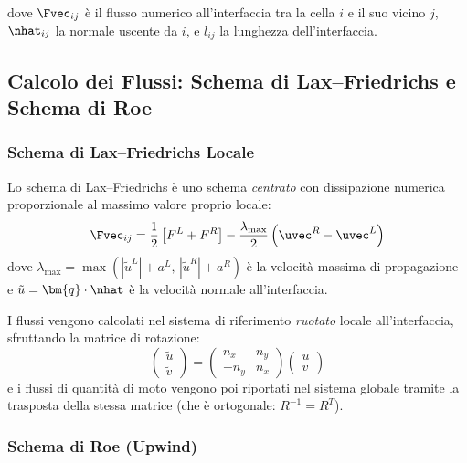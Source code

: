 dove $\Fvec_{ij}$ è il flusso numerico all'interfaccia tra la cella $i$ e il suo vicino $j$,
$\nhat_{ij}$ la normale uscente da $i$, e $l_{ij}$ la lunghezza dell'interfaccia.

\subsection{Calcolo dei Flussi: Schema di Lax--Friedrichs e Schema di Roe}

\subsubsection{Schema di Lax--Friedrichs Locale}

Lo schema di Lax--Friedrichs è uno schema \emph{centrato} con dissipazione numerica
proporzionale al massimo valore proprio locale:
\begin{equation}
  \Fvec_{ij} = \frac{1}{2}\left[F^L + F^R\right]
               - \frac{\lambda_{\max}}{2}\left(\uvec^R - \uvec^L\right)
\end{equation}
dove $\lambda_{\max} = \max(|\tilde{u}^L|+a^L,\,|\tilde{u}^R|+a^R)$ è la velocità massima
di propagazione e $\tilde{u} = \bm{q}\cdot\nhat$ è la velocità normale all'interfaccia.

I flussi vengono calcolati nel sistema di riferimento \emph{ruotato} locale all'interfaccia,
sfruttando la matrice di rotazione:
\begin{equation}
  \begin{pmatrix} \tilde{u} \\ \tilde{v} \end{pmatrix} =
  \begin{pmatrix} n_x & n_y \\ -n_y & n_x \end{pmatrix}
  \begin{pmatrix} u \\ v \end{pmatrix}
\end{equation}
e i flussi di quantità di moto vengono poi riportati nel sistema globale tramite la trasposta
della stessa matrice (che è ortogonale: $R^{-1} = R^T$).

\subsubsection{Schema di Roe (Upwind)}

